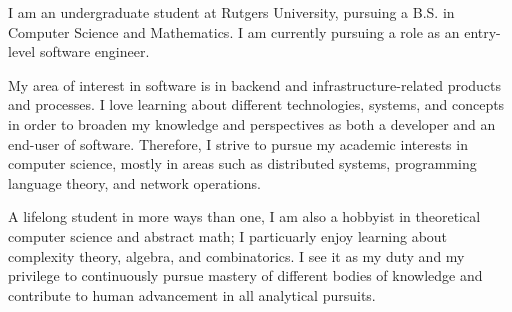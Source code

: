 

\begin{cvparagraph}
I am an undergraduate student at Rutgers University, pursuing a B.S. in Computer Science and Mathematics. I am currently pursuing a role as an entry-level software engineer.
\end{cvparagraph}

\begin{cvparagraph}
My area of interest in software is in backend and infrastructure-related products and processes. I love learning about different technologies, systems, and concepts in order to broaden my knowledge and perspectives as both a developer and an end-user of software. Therefore, I strive to pursue my academic interests in computer science, mostly in areas such as distributed systems, programming language theory, and network operations.
\end{cvparagraph}

\begin{cvparagraph}
A lifelong student in more ways than one, I am also a hobbyist in theoretical computer science and abstract math; I particuarly enjoy learning about complexity theory, algebra, and combinatorics. I see it as my duty and my privilege to continuously pursue mastery of different bodies of knowledge and contribute to human advancement in all analytical pursuits.
\end{cvparagraph}
